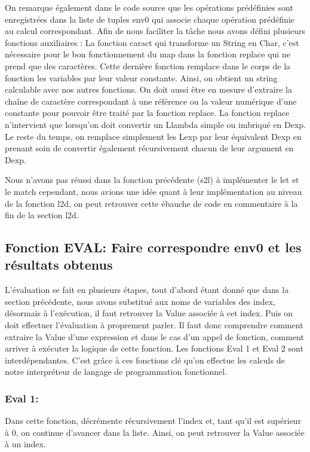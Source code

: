 \documentclass{article}
\begin{document}
On remarque également dans le code source que les opérations prédéfinies sont enregistrées dans la liste de tuples env0 qui associe chaque opération prédéfinie au calcul correspondant.
Afin de nous faciliter la tâche nous avons défini plusieurs fonctions auxiliaires :
La fonction caract qui transforme un String en Char, c'est nécessaire pour le bon fonctionnement du map dans la fonction replace qui ne prend que des caractères. Cette dernière fonction remplace dans le corps de la fonction les variables par leur valeur constante. Ainsi, on obtient un string calculable avec nos autres fonctions. On doit aussi être en mesure d'extraire la chaîne de caractère correspondant à une référence ou la valeur numérique d'une constante pour pouvoir être traité par la fonction replace.
La fonction replace n'intervient que lorsqu'on doit convertir un Llambda simple ou imbriqué en Dexp. Le reste du temps, on remplace simplement les Lexp par leur équivalent Dexp en prenant soin de convertir également récursivement chacun de leur argument en Dexp. 
\newline 

Nous n'avons pas réussi dans la fonction précédente (s2l) à implémenter le let et le match cependant, nous avions une idée quant à leur implémentation au niveau de la fonction l2d, on peut retrouver cette ébauche de code en commentaire à la fin de la section l2d.


\subsection{Fonction EVAL: Faire correspondre env0 et les résultats obtenus}
L'évaluation se fait en plusieurs étapes, tout d'abord étant donné que dans la section précédente, nous avons substitué aux noms de variables des index, désormais à l'exécution, il faut retrouver la Value associée à cet index. Puis on doit effectuer l’évaluation à proprement parler. Il faut donc comprendre comment extraire la Value d’une expression et dans le cas d’un appel de fonction, comment arriver à exécuter la logique de cette fonction.
Les fonctions Eval 1 et Eval 2 sont interdépendantes. C'est grâce à ces fonctions clé qu'on effectue les calculs de notre interpréteur de langage de programmation fonctionnel.


\subsubsection{Eval 1:}
Dans cette fonction, décrémente récursivement l'index et, tant qu'il est supérieur à 0, on continue d'avancer dans la liste. Ainsi, on peut retrouver la Value associée à un index.
\end{document}
